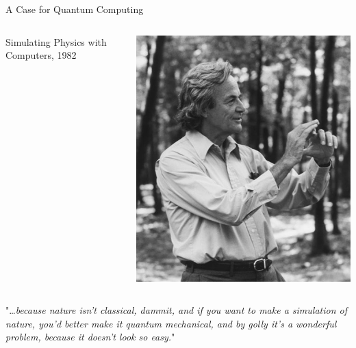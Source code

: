 \documentclass{beamer}
\begin{document}
\begin{frame}{A Case for Quantum Computing}

  \begin{minipage}[0.3\textheight]{\textwidth}
  \begin{columns}[c]
  \begin{column}{0.6\textwidth}
          Simulating Physics with Computers, 1982
  \end{column}
  \begin{column}{0.4\textwidth}
    \includegraphics[scale=1]{images/feynman.jpg}
  \end{column}
  \end{columns}
  \end{minipage}

  \vfill
  \scriptsize{
          "\dots \emph{because nature isn't
                  classical, dammit, and if you want to make a simulation of nature, you'd
                  better make it quantum mechanical, and by golly it's a wonderful problem,
                  because it doesn't look so easy.}"
  }

\end{frame}
\end{document}
